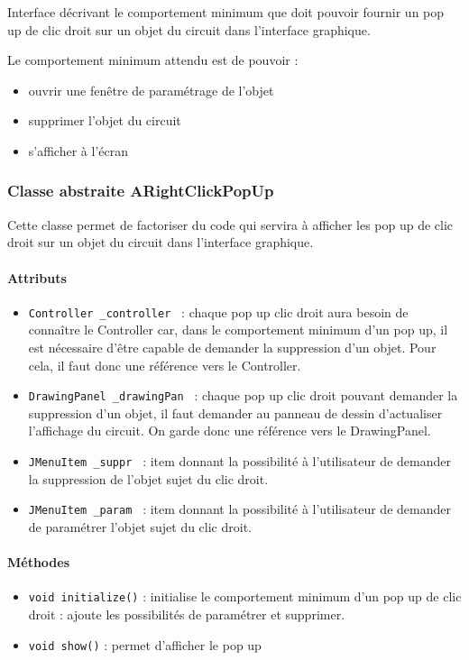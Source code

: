 \documentclass{report}
\begin{document}
Interface décrivant le comportement minimum que doit pouvoir fournir un pop up de clic droit sur un objet du circuit dans l'interface graphique.

Le comportement minimum attendu est de pouvoir :
\begin{itemize}
\item ouvrir une fenêtre de paramétrage de l'objet
\item supprimer l'objet du circuit
\item s'afficher à l'écran
\end{itemize}

\subsubsection{Classe abstraite ARightClickPopUp}

Cette classe permet de factoriser du code qui servira à afficher les pop up de clic droit sur un objet du circuit dans l'interface graphique.

\paragraph*{Attributs}
\begin{itemize}
\item \texttt{Controller \_controller } : chaque pop up clic droit aura besoin de connaître le Controller car, dans le comportement minimum d'un pop up, il est nécessaire d'être capable de demander la suppression d'un objet. Pour cela, il faut donc une référence vers le Controller.
\item \texttt{DrawingPanel \_drawingPan } : chaque pop up clic droit pouvant demander la suppression d'un objet, il faut demander au panneau de dessin d'actualiser l'affichage du circuit. On garde donc une référence vers le DrawingPanel.
\item \texttt{JMenuItem \_suppr } : item donnant la possibilité à l'utilisateur de demander la suppression de l'objet sujet du clic droit.
\item \texttt{JMenuItem \_param } : item donnant la possibilité à l'utilisateur de demander de paramétrer l'objet sujet du clic droit.
\end{itemize}

\paragraph*{Méthodes}
\begin{itemize}
\item \texttt{void initialize()} : initialise le comportement minimum d'un pop up de clic droit : ajoute les possibilités de paramétrer et supprimer.
\item \texttt{void show()} : permet d'afficher le pop up
\end{itemize}
\end{document}
